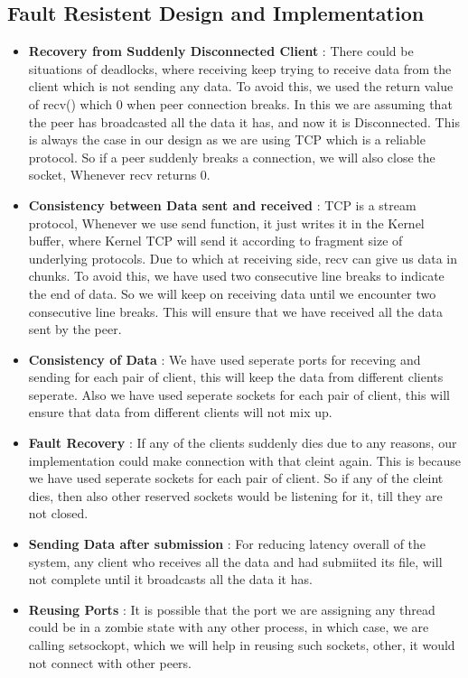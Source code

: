 \documentclass[12pt]{scrartcl}
\begin{document}
\subsection{Fault Resistent Design and Implementation}
\begin{itemize}
    \item \textbf{Recovery from Suddenly Disconnected Client} : There could be situations of deadlocks, where receiving keep trying to receive data from the client which is not sending any data. To avoid this, we used the return value of recv() which 0 when peer connection breaks. In this we are assuming that the peer has broadcasted all the data it has, and now it is Disconnected. This is always the case in our design as we are using TCP which is a reliable protocol. So if a peer suddenly breaks a connection, we will also close the socket, Whenever recv returns 0.
    \item \textbf{Consistency between Data sent and received} : TCP is a stream protocol, Whenever we use send function, it just writes it in the Kernel buffer, where Kernel TCP will send it according to fragment size of underlying protocols. Due to which at receiving side, recv can give us data in chunks. To avoid this, we have used two consecutive line breaks to indicate the end of data. So we will keep on receiving data until we encounter two consecutive line breaks. This will ensure that we have received all the data sent by the peer.
    \item \textbf{Consistency of Data} : We have used seperate ports for receving and sending for each pair of client, this will keep the data from different clients seperate. Also we have used seperate sockets for each pair of client, this will ensure that data from different clients will not mix up.
    \item \textbf{Fault Recovery} : If any of the clients suddenly dies due to any reasons, our implementation could make connection with that cleint again. This is because we have used seperate sockets for each pair of client. So if any of the cleint dies, then also other reserved sockets would be listening for it, till they are not closed.
    \item \textbf{Sending Data after submission} : For reducing latency overall of the system, any client who receives all the data and had submiited its file, will not complete until it broadcasts all the data it has.
    \item \textbf{Reusing Ports} : It is possible that the port we are assigning any thread could be in a zombie state with any other process, in which case, we are calling setsockopt, which we will help in reusing such sockets, other, it would not connect with other peers.
\end{itemize}
\end{document}
